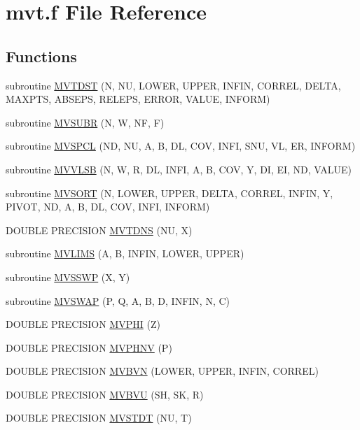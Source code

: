 \hypertarget{mvt_8f}{
\section{mvt.f File Reference}
\label{mvt_8f}
}
\subsection*{Functions}
\begin{CompactItemize}
\item 
subroutine \hyperlink{mvt_8f_4b51e2fd2b5378c70a36771ac4cfed04}{MVTDST} (N, NU, LOWER, UPPER, INFIN, CORREL, DELTA, MAXPTS, ABSEPS, RELEPS, ERROR, VALUE, INFORM)
\item 
subroutine \hyperlink{mvt_8f_1e3a3eb63d17fe37f686fc1f571beccc}{MVSUBR} (N, W, NF, F)
\item 
subroutine \hyperlink{mvt_8f_cb964c59585b62348fb9653f052c669e}{MVSPCL} (ND, NU, A, B, DL, COV, INFI, SNU, VL, ER, INFORM)
\item 
subroutine \hyperlink{mvt_8f_7319671edcfbb7bd0e50690518e644fc}{MVVLSB} (N, W, R, DL, INFI, A, B, COV, Y, DI, EI, ND, VALUE)
\item 
subroutine \hyperlink{mvt_8f_e6a30b16d74f1c585c70de45080c0805}{MVSORT} (N, LOWER, UPPER, DELTA, CORREL, INFIN, Y, PIVOT, ND, A, B, DL, COV, INFI, INFORM)
\item 
DOUBLE PRECISION \hyperlink{mvt_8f_7edd239860c89b5fa9fb100b194fa833}{MVTDNS} (NU, X)
\item 
subroutine \hyperlink{mvt_8f_ae28c99f4b4ff2300cfa96ffa62bf799}{MVLIMS} (A, B, INFIN, LOWER, UPPER)
\item 
subroutine \hyperlink{mvt_8f_2a36c253875e26e22bbb20a386c9a580}{MVSSWP} (X, Y)
\item 
subroutine \hyperlink{mvt_8f_5411cfeafe20ca2bd17c962f8c8c0e84}{MVSWAP} (P, Q, A, B, D, INFIN, N, C)
\item 
DOUBLE PRECISION \hyperlink{mvt_8f_a0072dd6ba4c47d28d78d231b5af9571}{MVPHI} (Z)
\item 
DOUBLE PRECISION \hyperlink{mvt_8f_9ce2ff2aa4833561178c981ac2469470}{MVPHNV} (P)
\item 
DOUBLE PRECISION \hyperlink{mvt_8f_01b86430a337d3d8b91bcf9346d7dd3b}{MVBVN} (LOWER, UPPER, INFIN, CORREL)
\item 
DOUBLE PRECISION \hyperlink{mvt_8f_151b69372f580727b65189d3ba4c08e4}{MVBVU} (SH, SK, R)
\item 
DOUBLE PRECISION \hyperlink{mvt_8f_33d5a1ab44132a99ec34a2a0c899cdcb}{MVSTDT} (NU, T)

\end{CompactItemize}

